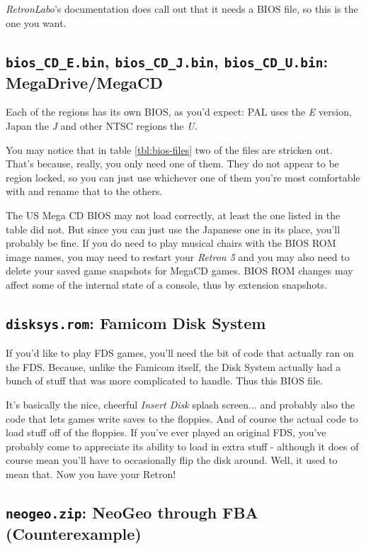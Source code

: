 \documentclass[english]{retronlabo-manual}
\begin{document}
\emph{RetronLabo}'s documentation does call out that it needs a BIOS file, so this is the one you want.

\subsection{\texttt{bios\_CD\_E.bin}, \texttt{bios\_CD\_J.bin}, \texttt{bios\_CD\_U.bin}: MegaDrive/MegaCD}

Each of the regions has its own BIOS, as you'd expect: PAL uses the \emph{E} version, Japan the \emph{J} and other NTSC regions the \emph{U}.

You may notice that in table \ref{tbl:bios-files} two of the files are stricken out. That's because, really, you only need one of them. They do not appear to be region locked, so you can just use whichever one of them you're most comfortable with and rename that to the others.

The US Mega CD BIOS may not load correctly, at least the one listed in the table did not. But since you can just use the Japanese one in its place, you'll probably be fine. If you do need to play musical chairs with the BIOS ROM image names, you may need to restart your \emph{Retron 5} and you may also need to delete your saved game snapshots for MegaCD games. BIOS ROM changes may affect some of the internal state of a console, thus by extension snapshots.

\subsection{\texttt{disksys.rom}: Famicom Disk System}

If you'd like to play FDS games, you'll need the bit of code that actually ran on the FDS. Because, unlike the Famicom itself, the Disk System actually had a bunch of stuff that was more complicated to handle. Thus this BIOS file.

It's basically the nice, cheerful \emph{Insert Disk} splash screen... and probably also the code that lets games write saves to the floppies. And of course the actual code to load stuff off of the floppies. If you've ever played an original FDS, you've probably come to appreciate its ability to load in extra stuff - although it does of course mean you'll have to occasionally flip the disk around. Well, it used to mean that. Now you have your Retron!

\subsection{\texttt{neogeo.zip}: NeoGeo through FBA (Counterexample)}
\end{document}
